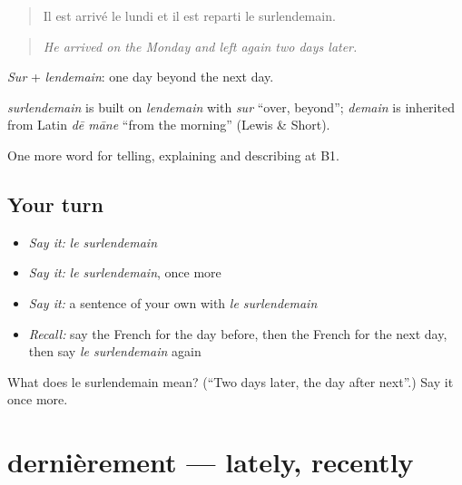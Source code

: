 \begin{quote}
Il est arrivé le lundi et il est reparti le surlendemain.
\end{quote}

\begin{quote}
\emph{He arrived on the Monday and left again two days later.}
\end{quote}

\emph{Sur} + \emph{lendemain}: one day beyond the next day.

\begin{cousinweb}
\emph{surlendemain} is built on \emph{lendemain} with \emph{sur} \textquotedblleft{}over, beyond\textquotedblright{}; \emph{demain} is inherited from Latin \emph{dē māne} \textquotedblleft{}from the morning\textquotedblright{} (Lewis \& Short).
\end{cousinweb}

\begin{grammarlens}[title={What you've built}]
One more word for telling, explaining and describing at B1.
\end{grammarlens}

\subsection*{Your turn}
\begin{itemize}
\raggedright
  \item \emph{Say it:} \emph{le surlendemain}
  \item \emph{Say it:} \emph{le surlendemain}, once more
  \item \emph{Say it:} a sentence of your own with \emph{le surlendemain}
  \item \emph{Recall:} say the French for the day before, then the French for the next day, then say \emph{le surlendemain} again
\end{itemize}

\begin{tcolorbox}[breakable,colback=teal!4,colframe=teal!35!black,title={Before you move on}]
What does le surlendemain mean? (\textquotedblleft{}Two days later, the day after next\textquotedblright{}.) Say it once more.
\end{tcolorbox}
\section[dernièrement]{dernièrement — lately, recently}

\label{lesson:FR-C273-dernierement}



